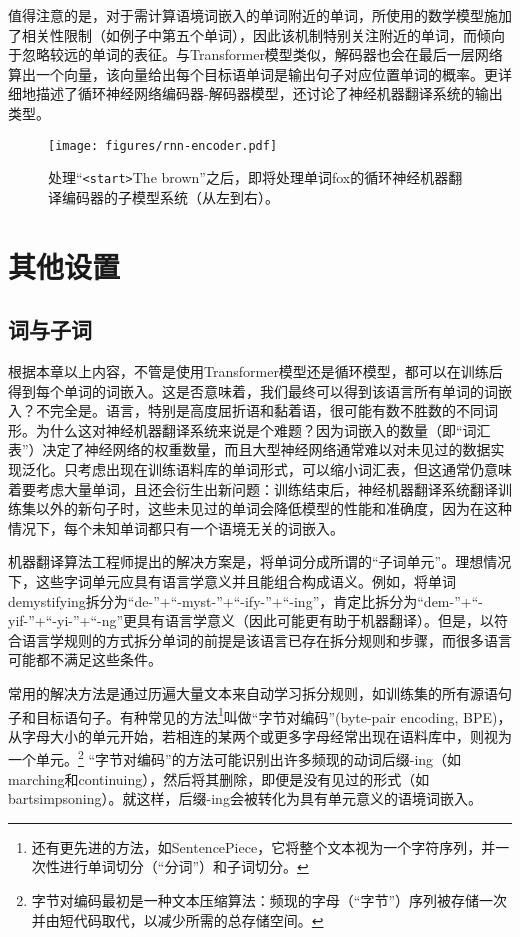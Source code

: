 \documentclass[output=paper,colorlinks,citecolor=brown]{langscibook}
\begin{document}
值得注意的是，对于需计算语境词嵌入的单词附近的单词，所使用的数学模型施加了相关性限制（如例子中第五个单词），因此该机制特别关注附近的单词，而倾向于忽略较远的单词的表征。与Transformer模型类似，解码器也会在最后一层网络算出一个向量，该向量给出每个目标语单词是输出句子对应位置单词的概率。\citet{forcada2017making}更详细地描述了循环神经网络编码器-解码器模型，还讨论了神经机器翻译系统的输出类型。

\begin{figure}[tb]
\centering
    \texttt{[image: figures/rnn-encoder.pdf]}
\caption{处理“\texttt{<start>}The brown”之后，即将处理单词fox的循环神经机器翻译编码器的子模型系统（从左到右）。
}
\label{fg:recurrent}
\end{figure}


\section{其他设置}

\subsection{词与子词}
\largerpage
根据本章以上内容，不管是使用Transformer模型还是循环模型，都可以在训练后得到每个单词的词嵌入。这是否意味着，我们最终可以得到该语言所有单词的词嵌入？不完全是。语言，特别是高度屈折语和黏着语，很可能有数不胜数的不同词形。为什么这对神经机器翻译系统来说是个难题？因为词嵌入的数量（即“词汇表”）决定了神经网络的权重数量，而且大型神经网络通常难以对未见过的数据实现泛化。只考虑出现在训练语料库的单词形式，可以缩小词汇表，但这通常仍意味着要考虑大量单词，且还会衍生出新问题：训练结束后，神经机器翻译系统翻译训练集以外的新句子时，这些未见过的单词会降低模型的性能和准确度，因为在这种情况下，每个未知单词都只有一个语境无关的词嵌入。

机器翻译算法工程师提出的解决方案是，将单词分成所谓的“子词单元”。理想情况下，这些字词单元应具有语言学意义并且能组合构成语义。例如，将单词demystifying拆分为“de-”+“-myst-”+“-ify-”+“-ing”，肯定比拆分为“dem-”+“-yif-”+“-yi-”+“-ng”更具有语言学意义（因此可能更有助于机器翻译）。但是，以符合语言学规则的方式拆分单词的前提是该语言已存在拆分规则和步骤，而很多语言可能都不满足这些条件。

常用的解决方法是通过历遍大量文本来自动学习拆分规则，如训练集的所有源语句子和目标语句子。有种常见的方法\footnote{还有更先进的方法，如SentencePiece\citep{kudo2018sentencepiece}，它将整个文本视为一个字符序列，并一次性进行单词切分（“分词”）和子词切分。}叫做“字节对编码”(byte-pair encoding, BPE)，从字母大小的单元开始，若相连的某两个或更多字母经常出现在语料库中，则视为一个单元。\footnote{字节对编码最初是一种文本压缩算法：频现的字母（“字节”）序列被存储一次并由短代码取代，以减少所需的总存储空间。} “字节对编码”的方法可能识别出许多频现的动词后缀-ing（如marching和continuing），然后将其删除，即便是没有见过的形式（如bartsimpsoning）。就这样，后缀-ing会被转化为具有单元意义的语境词嵌入。
\end{document}
